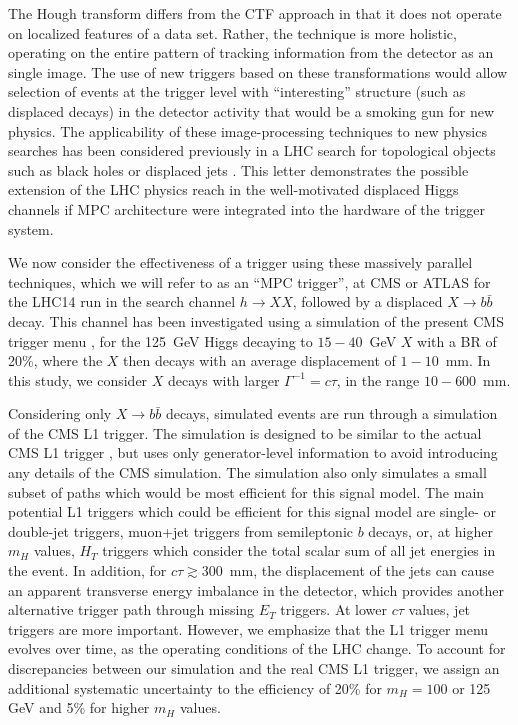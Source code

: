 \documentclass[aps,prl,twocolumn,preprintnumbers,groupedaddress,nofootinbib]{revtex4}
\begin{document}
The Hough transform differs from the CTF approach in that it does not operate on localized features of a data set. Rather, the technique is more holistic, operating on the entire pattern of tracking information from the detector as an single image. The use of new triggers based on these transformations would allow selection of events at the trigger level with ``interesting'' structure (such as displaced decays) in the detector activity that would be a smoking gun for new physics. The applicability of these image-processing techniques to new physics searches has been considered previously in a LHC search for topological objects such as black holes or displaced jets \cite{Halyo:2013cza}. This letter demonstrates the possible extension of the LHC physics reach in the well-motivated displaced Higgs channels if MPC architecture were integrated into the hardware of the trigger system.

We now consider the effectiveness of a trigger using these massively parallel techniques, which we will refer to as an ``MPC trigger'', at CMS or ATLAS for the LHC14 run in the search channel $h \to XX$, followed by a displaced $X \to b\bar{b}$ decay. This channel has been investigated using a simulation of the present CMS trigger menu \cite{Halyo:2013yfa}, for the 125~GeV Higgs decaying to $15-40$~GeV $X$ with a BR of 20\%, where the $X$ then decays with an average displacement of $1-10$~mm. In this study, we consider $X$ decays with larger $\Gamma^{-1} = c\tau$, in the range $10-600$~mm. 

Considering only $X\to b\bar{b}$ decays, simulated events are run through a simulation of the CMS L1 trigger. The simulation is designed to be similar to the actual CMS L1 trigger \cite{Brooke:2013hnf}, but uses only generator-level information to avoid introducing any details of the CMS simulation. The simulation also only simulates a small subset of paths which would be most efficient for this signal model. The main potential L1 triggers which could be efficient for this signal model are single- or double-jet triggers, muon+jet triggers from semileptonic $b$ decays, or, at higher $m_H$ values, $H_T$ triggers which consider the total scalar sum of all jet energies in the event. In addition, for $c\tau \gtrsim 300$~mm, the displacement of the jets can cause an apparent transverse energy imbalance in the detector, which provides another alternative trigger path through missing $E_T$ triggers. At lower $c\tau$ values, jet triggers are more important. However, we emphasize that the L1 trigger menu evolves over time, as the operating conditions of the LHC change. To account for discrepancies between our simulation and the real CMS L1 trigger, we assign an additional systematic uncertainty to the efficiency of 20\% for $m_H = 100$ or 125 GeV and 5\% for higher $m_H$ values.
\end{document}
